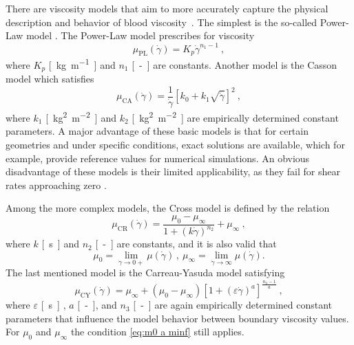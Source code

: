 There are viscosity models that aim to more accurately capture the physical description and behavior of blood viscosity~\cite{Saloner2019, Eichler2023, Boyd2007}. The simplest is the so-called Power-Law model \cite{Sequeira}. The Power-Law model prescribes for viscosity
\begin{equation}\label{eq:power-law}
	\mu _{\text{PL}} (\dot{\gamma}) = K_p  \dot{\gamma} ^{n_1-1} \ ,
\end{equation}
where $ K_p$ \si{[kg.m^{-1}]} and $ n_1 $ \si{[-]} are constants. Another model is the Casson model \cite{Boyd2007} which satisfies
\begin{equation}\label{eq:Casson}
	\mu _{\text{CA}} (\dot{\gamma}) = \frac{1}{\dot{\gamma}} \left[ k_{0} + k_{1} \sqrt{\dot{\gamma}} \right]^2 \ ,
\end{equation}
where $ k_1$ \si{[kg^{2}.m^{-2}]} and $ k_2 $ \si{[kg^{2}.m^{-2}]} are empirically determined constant parameters. A major advantage of these basic models is that for certain geometries and under specific conditions, exact solutions are available, which for example, provide reference values for numerical simulations. An obvious disadvantage of these models is their limited applicability, as they fail for shear rates approaching zero \cite{Boyd2007}.

Among the more complex models, the Cross model \cite{Sequeira} is defined by the relation
\begin{equation}\label{eq:cross}
	\mu _{\text{CR}} (\dot{\gamma}) = \frac{\mu_{0} - \mu_{\infty}}{1 + (k\dot{\gamma})^{n_2}} + \mu_{\infty}  \ ,
\end{equation}
where $ k $ \si{[s]} and $ n_2 $ \si{[-]} are constants, and it is also valid that
\begin{equation}\label{eq:m0 a minf}
	\mu _{0}  = \lim_{\dot{\gamma} \rightarrow 0+}\mu (\dot{\gamma})\, , \ \mu_{\infty} = \lim_{\dot{\gamma} \rightarrow \infty}\mu (\dot{\gamma}).
\end{equation}
The last mentioned model is the Carreau-Yasuda model \cite{Boyd2007} satisfying
\begin{equation}\label{eq:C-Y}
	\mu _{\text{CY}} (\dot{\gamma}) = \mu_{\infty} + (\mu_{0} - \mu_{\infty}) \left[ 1 + (\varepsilon \dot{\gamma}) ^{a} \right]^{\frac{n_3-1}{a}} \ ,
\end{equation}
where $ \varepsilon$ \si{[s]} , $a$ \si{[-]}, and $ n_3 $ \si{[-]} are again empirically determined constant parameters that influence the model behavior between boundary viscosity values. For $ \mu_{0}$ and $ \mu_{\infty} $ the condition \eqref{eq:m0 a minf} still applies.

